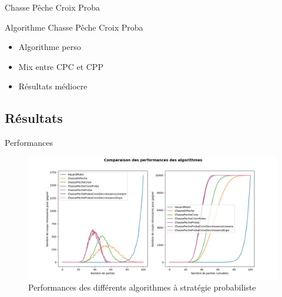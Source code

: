 	\begin{frame}{Chasse Pêche Croix Proba}
	    \begin{block}{Algorithme Chasse Pêche Croix Proba}
	        \begin{itemize}
	            \item Algorithme perso
	            \item Mix entre CPC et CPP
	            \item Résultats médiocre 
	        \end{itemize}{}
	    \end{block}
	\end{frame}{}

\subsection{Résultats}
	
	\begin{frame}{Performances}
		\begin{figure}
		    \centering
		    \includegraphics[width=.99\linewidth]{images/perfsstats.png}
		    \caption{Performances des différents algorithmes à stratégie probabiliste} %
		    \label{fig:perfsstats}
		\end{figure}{}
	\end{frame}